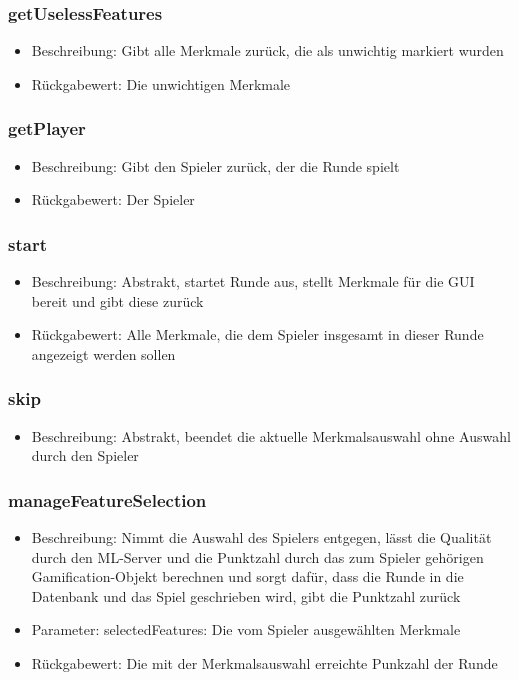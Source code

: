 \documentclass[a4paper]{scrreprt}
\begin{document}
	\subsubsection{getUselessFeatures}
	\begin{itemize}
		\item Beschreibung: Gibt alle Merkmale zurück, die als unwichtig markiert wurden
		\item Rückgabewert: Die unwichtigen Merkmale
	\end{itemize}
	\subsubsection{getPlayer}
		\begin{itemize}
			\item Beschreibung: Gibt den Spieler zurück, der die Runde spielt
			\item Rückgabewert: Der Spieler
		\end{itemize}
	\subsubsection{start}
		\begin{itemize}
			\item Beschreibung: Abstrakt, startet Runde aus, stellt Merkmale für die GUI bereit und gibt diese zurück
			\item Rückgabewert: Alle Merkmale, die dem Spieler insgesamt in dieser Runde angezeigt werden sollen
		\end{itemize}
	\subsubsection{skip}
		\begin{itemize}
			\item Beschreibung: Abstrakt, beendet die aktuelle Merkmalsauswahl ohne Auswahl durch den Spieler
		\end{itemize}
	\subsubsection{manageFeatureSelection}
	\begin{itemize}
	\item Beschreibung: Nimmt die Auswahl des Spielers entgegen, lässt die Qualität durch den ML-Server und die Punktzahl durch das zum Spieler gehörigen Gamification-Objekt berechnen und sorgt dafür, dass die Runde in die Datenbank und das Spiel geschrieben wird, gibt die Punktzahl zurück
	\item Parameter: selectedFeatures: Die vom Spieler ausgewählten Merkmale
	\item Rückgabewert: Die mit der Merkmalsauswahl erreichte Punkzahl der Runde
	\end{itemize}
\end{document}
